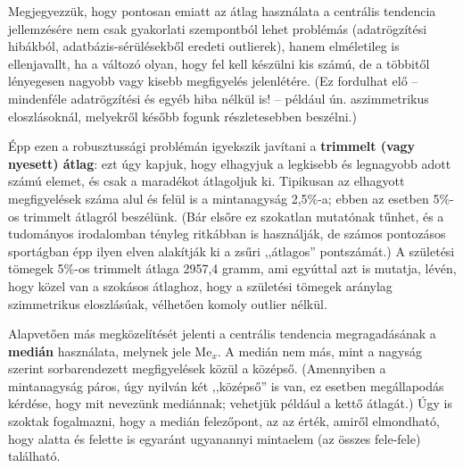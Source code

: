 \documentclass[]{book}
\begin{document}
Megjegyezzük, hogy pontosan emiatt az átlag használata a centrális
tendencia jellemzésére nem csak gyakorlati szempontból lehet problémás
(adatrögzítési hibákból, adatbázis-sérülésekből eredeti outlierek),
hanem elméletileg is ellenjavallt, ha a változó olyan, hogy fel kell
készülni kis számú, de a többitől lényegesen nagyobb vagy kisebb
megfigyelés jelenlétére. (Ez fordulhat elő -- mindenféle adatrögzítési
és egyéb hiba nélkül is! -- például ún. aszimmetrikus eloszlásoknál,
melyekről később fogunk részletesebben beszélni.)

Épp ezen a robusztussági problémán igyekszik javítani a \textbf{trimmelt
(vagy nyesett) átlag}: ezt úgy kapjuk, hogy elhagyjuk a legkisebb és
legnagyobb adott számú elemet, és csak a maradékot átlagoljuk ki.
Tipikusan az elhagyott megfigyelések száma alul és felül is a
mintanagyság 2,5\%-a; ebben az esetben 5\%-os trimmelt átlagról
beszélünk. (Bár elsőre ez szokatlan mutatónak tűnhet, és a tudományos
irodalomban tényleg ritkábban is használják, de számos pontozásos
sportágban épp ilyen elven alakítják ki a zsűri ,,átlagos'' pontszámát.)
A születési tömegek 5\%-os trimmelt átlaga 2957,4 gramm, ami egyúttal
azt is mutatja, lévén, hogy közel van a szokásos átlaghoz, hogy a
születési tömegek aránylag szimmetrikus eloszlásúak, vélhetően komoly
outlier nélkül.

Alapvetően más megközelítését jelenti a centrális tendencia
megragadásának a \textbf{medián} használata, melynek jele
\(\mathrm{Me}_x\). A medián nem más, mint a nagyság szerint
sorbarendezett megfigyelések közül a középső. (Amennyiben a mintanagyság
páros, úgy nyilván két ,,középső'' is van, ez esetben megállapodás
kérdése, hogy mit nevezünk mediánnak; vehetjük például a kettő átlagát.)
Úgy is szoktak fogalmazni, hogy a medián felezőpont, az az érték, amiről
elmondható, hogy alatta és felette is egyaránt ugyanannyi mintaelem (az
összes fele-fele) található.
\end{document}
